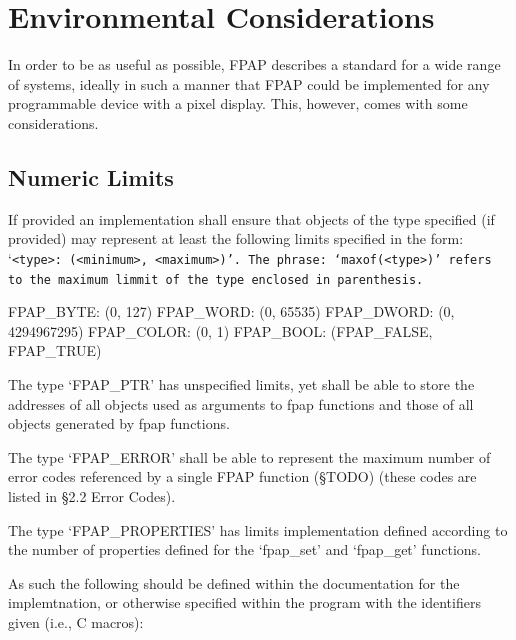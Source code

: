 \chapter{Environmental Considerations}

\noindent In order to be as useful as possible, FPAP describes a standard for
a wide range of systems, ideally in such a manner that FPAP could be
implemented for any programmable device with a pixel display. This, however,
comes with some considerations.

\section{Numeric Limits}

\noindent If provided an implementation shall ensure that objects of the type
specified (if provided) may represent at least the following limits specified
in the form: `\tt<type>: (<minimum>, <maximum>)\rm'.  The phrase:
`\tt maxof(<type>)\rm' refers to the maximum limmit of the type enclosed in
parenthesis.

\relax
\limit FPAP\_BYTE: (0, 127)
\limit FPAP\_WORD: (0, 65535)
\limit FPAP\_DWORD: (0, 4294967295)
\limit FPAP\_COLOR: (0, 1)
\limit FPAP\_BOOL:  (FPAP\_FALSE, FPAP\_TRUE)

\noindent The type `FPAP\_PTR' has unspecified limits, yet shall be able to
store the addresses of all objects used as arguments to fpap functions and
those of all objects generated by fpap functions.

The type `FPAP\_ERROR' shall be able to represent the maximum number of error
codes referenced by a single FPAP function (\S TODO) (these codes are listed
in \S 2.2 Error Codes).

The type `FPAP\_PROPERTIES' has limits implementation defined according to the
number of properties defined for the `fpap\_set' and `fpap\_get' functions.

As such the following should be defined within the documentation for the
implemtnation, or otherwise specified within the program with the identifiers
given (i.e., C macros):

	

